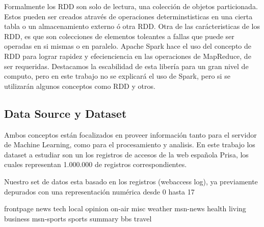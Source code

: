 	Formalmente los RDD son solo de lectura, una colección de objetos particionada. Estos pueden ser creados através de  operaciones determinstisticas en una cierta tabla o un almacenamiento externo ó otra RDD.
	Otra de las carácteristicas de los RDD, es que son colecciones de elementos toleantes a fallas que puede ser operadas en si mismas o en paralelo.
	Apache Spark hace el uso del concepto de RDD para lograr rapidez y efecienciencia en las operaciones de MapReduce, de ser requeridas. Destacamos la escabilidad de esta libería para un gran nivel de computo, pero en este trabajo no se explicará el uso de Spark, pero si se utilizarán algunos conceptos como RDD y otros.




\subsection{Data Source y Dataset }

	Ambos conceptos están focalizados en  proveer información tanto para el servidor de Machine Learning, como para el procesamiento y analisis.
	En este trabajo los dataset a estudiar son un los registros de accesos de la web española Prisa, los cuales representan 1.000.000 de registros correspondientes.

	Nuestro set de  datos esta basado en los registros (webaccess log), ya previamente depurados con una representación numérica desde 0 hasta 17 

	frontpage news tech local opinion on-air misc weather msn-news health living business msn-sports sports summary bbs travel








